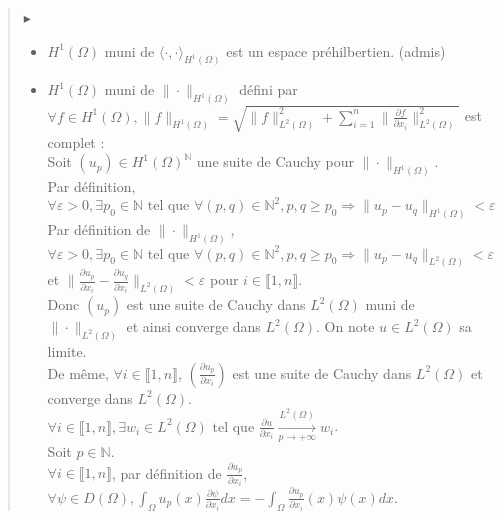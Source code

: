 \documentclass[12pt,a4paper]{article}
\newcommand{\preuve}[1]{%
    \begin{quote}
        $\blacktriangleright$~#1
    \end{quote}
}
\begin{document}
\preuve{
    \begin{itemize}
        \item $H^1(\Omega)$ muni de $\langle \cdot, \cdot \rangle_{H^1(\Omega)}$ est un espace préhilbertien. (admis)
        \item $H^1(\Omega)$ muni de $\| \cdot \|_{H^1(\Omega)}$ défini par $\forall f \in H^1(\Omega), \| f \|_{H^1(\Omega)} = \sqrt{\| f \|_{L^2(\Omega)}^2 + \sum_{i=1}^n \| \frac{\partial f}{\partial x_i} \|_{L^2(\Omega)}^2}$ est complet : \\
        
        Soit $(u_p) \in H^1(\Omega)^{\mathbb{N}}$ une suite de Cauchy pour $\| \cdot \|_{H^1(\Omega)}$. \\
        Par définition, \\
        $\forall \varepsilon > 0, \exists p_0 \in \mathbb{N} \text{ tel que } \forall (p, q) \in \mathbb{N}^2, p, q \geq p_0 \Rightarrow \| u_p - u_q \|_{H^1(\Omega)} < \varepsilon$ \\

        Par définition de $\| \cdot \|_{H^1(\Omega)}$, \\
        $\forall \varepsilon > 0, \exists p_0 \in \mathbb{N} \text{ tel que } \forall (p, q) \in \mathbb{N}^2, p, q \geq p_0 \Rightarrow \| u_p - u_q \|_{L^2(\Omega)} < \varepsilon$ et $\| \frac{\partial u_p}{\partial x_i} - \frac{\partial u_q}{\partial x_i} \|_{L^2(\Omega)} < \varepsilon$ pour $i \in \llbracket 1, n \rrbracket$. \\

        Donc $(u_p)$ est une suite de Cauchy dans $L^2(\Omega)$ muni de $\| \cdot \|_{L^2(\Omega)}$ et ainsi converge dans $L^2(\Omega)$. On note $u \in L^2(\Omega)$ sa limite. \\

        De même, $\forall i \in \llbracket 1, n \rrbracket$, $(\frac{\partial u_p}{\partial x_i})$ est une suite de Cauchy dans $L^2(\Omega)$ et converge dans $L^2(\Omega)$. \\
        $\forall i \in \llbracket 1, n \rrbracket, \exists w_i \in L^2(\Omega) \text{ tel que } \frac{\partial u}{\partial x_i} \xrightarrow[p \rightarrow +\infty]{L^2(\Omega)} w_i$. \\

        Soit $p \in \mathbb{N}$. \\
        $\forall i \in \llbracket 1, n \rrbracket$, par définition de $\frac{\partial u_p}{\partial x_i}$, \\
        $\forall \psi \in D(\Omega), \int_{\Omega} u_p(x) \frac{\partial \psi}{\partial x_i} dx = - \int_{\Omega} \frac{\partial u_p}{\partial x_i}(x) \psi(x) dx$. \\


\end{itemize}}
\end{document}
